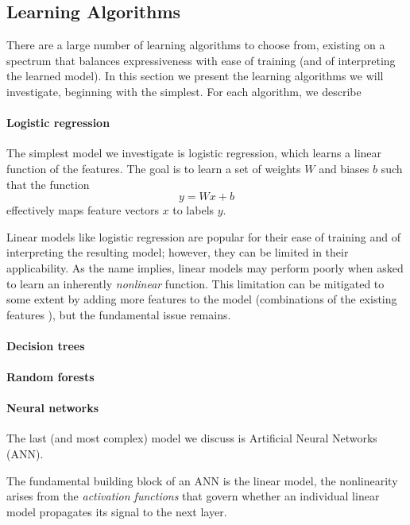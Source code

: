 \subsection{Learning Algorithms}
\label{sec:models}
%
There are a large number of learning algorithms to choose from, existing
on a spectrum that balances expressiveness with ease of training (and of
interpreting the learned model).
%
In this section we present the learning algorithms we will investigate,
beginning with the simplest.
%
For each algorithm, we describe 

\paragraph{Logistic regression}
The simplest model we investigate is logistic regression, which learns a
linear function of the features.
%
The goal is to learn a set of weights $W$ and biases $b$ such that the
function
%
$$
y = Wx + b
$$
%
effectively maps feature vectors $x$ to labels $y$.


Linear models like logistic regression are popular for their ease of
training and of interpreting the resulting model; however, they can be
limited in their applicability.
%
As the name implies, linear models may perform poorly when asked to
learn an inherently \emph{nonlinear} function.
%
This limitation can be mitigated to some extent by adding more features
to the model (\eg combinations of the existing features ), but
the fundamental issue remains.

\paragraph{Decision trees}

\paragraph{Random forests}

\paragraph{Neural networks}
The last (and most complex) model we discuss is Artificial Neural
Networks (ANN).

The fundamental building block of an ANN is the linear model, the
nonlinearity arises from the \emph{activation functions} that govern
whether an individual linear model propagates its signal to the next layer.





